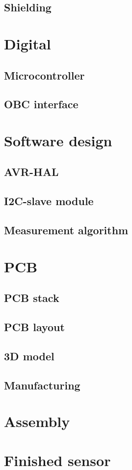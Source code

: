 \subsection{Shielding}

\section{Digital}
\subsection{Microcontroller}
\subsection{OBC interface}

\section{Software design}
\subsection{AVR-HAL}
\subsection{I2C-slave module}
\subsection{Measurement algorithm}

\section{PCB}
\subsection{PCB stack}
\subsection{PCB layout}
\subsection{3D model}
\subsection{Manufacturing}

\section{Assembly}

\section{Finished sensor}
